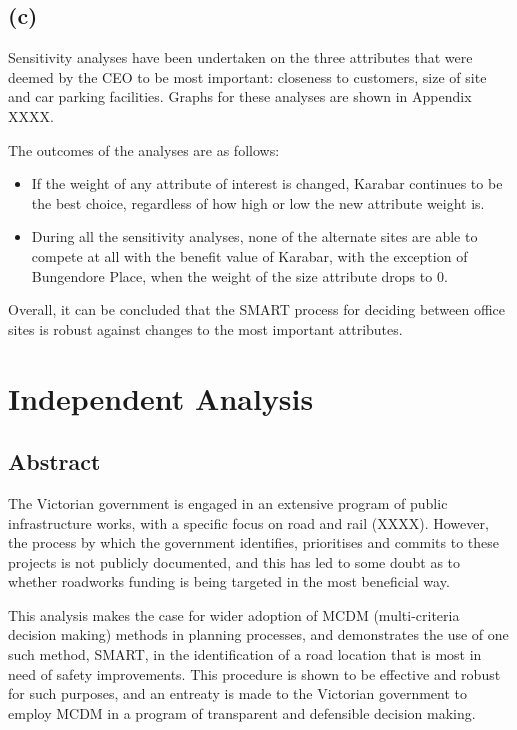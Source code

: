 \documentclass[11pt, a4paper]{article}
\begin{document}
    \subsection*{(c)}

    Sensitivity analyses have been undertaken on the three attributes that were deemed by the CEO to be most important: closeness to customers, size of site and car parking facilities. Graphs for these analyses are shown in Appendix XXXX.

    The outcomes of the analyses are as follows:

    \begin{itemize}
        \item If the weight of any attribute of interest is changed, Karabar continues to be the best choice, regardless of how high or low the new attribute weight is.
        \item During all the sensitivity analyses, none of the alternate sites are able to compete at all with the benefit value of Karabar, with the exception of Bungendore Place, when the weight of the size attribute drops to 0.
    \end{itemize}

    Overall, it can be concluded that the SMART process for deciding between office sites is robust against changes to the most important attributes.

    \section{Independent Analysis}
        
    \subsection{Abstract}

    The Victorian government is engaged in an extensive program of public infrastructure works, with a specific focus on road and rail (XXXX). However, the process by which the government identifies, prioritises and commits to these projects is not publicly documented, and this has led to some doubt as to whether roadworks funding is being targeted in the most beneficial way. 

    This analysis makes the case for wider adoption of MCDM (multi-criteria decision making) methods in planning processes, and demonstrates the use of one such method, SMART, in the identification of a road location that is most in need of safety improvements. This procedure is shown to be effective and robust for such purposes, and an entreaty is made to the Victorian government to employ MCDM in a program of transparent and defensible decision making.
\end{document}
